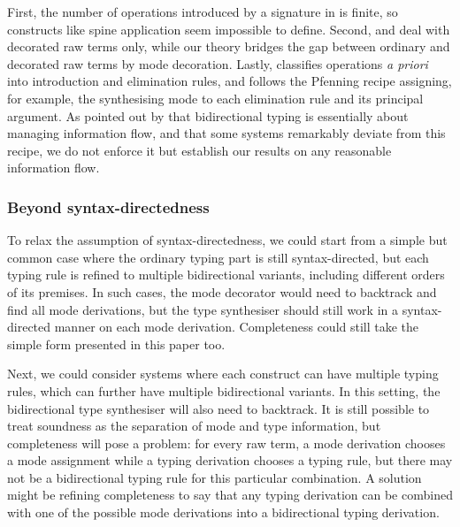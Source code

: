 First, the number of operations introduced by a signature in \LF is finite, so constructs like spine application seem impossible to define.
Second, \citeauthor{Reed2008} and \citeauthor{Felicissimo2023} deal with decorated raw terms only, while our theory bridges the gap between ordinary and decorated raw terms by mode decoration.
Lastly, \citeauthor{Felicissimo2023} classifies operations \emph{a priori} into introduction and elimination rules, and follows the Pfenning recipe assigning, for example, the synthesising mode to each elimination rule and its principal argument.
As pointed out by \citeauthor{Dunfield2021} that bidirectional typing is essentially about managing information flow, and that some systems remarkably deviate from this recipe, we do not enforce it but establish our results on any reasonable information flow.

\subsubsection{Beyond syntax-directedness}


To relax the assumption of syntax-directedness, we could start from a simple but common case where the ordinary typing part is still syntax-directed, but each typing rule is refined to multiple bidirectional variants, including different orders of its premises.
In such cases, the mode decorator would need to backtrack and find all mode derivations, but the type synthesiser should still work in a syntax-directed manner on each mode derivation.
Completeness could still take the simple form presented in this paper too.

Next, we could consider systems where each construct can have multiple typing rules, which can further have multiple bidirectional variants.
In this setting, the bidirectional type synthesiser will also need to backtrack.
It is still possible to treat soundness as the separation of mode and type information, but completeness will pose a problem:
for every raw term, a mode derivation chooses a mode assignment while a typing derivation chooses a typing rule, but there may not be a bidirectional typing rule for this particular combination.
A solution might be refining completeness to say that any typing derivation can be combined with one of the possible mode derivations into a bidirectional typing derivation.



